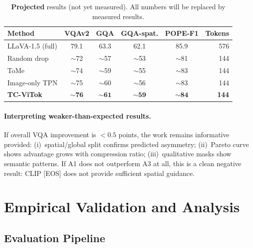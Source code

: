 \documentclass[11pt,a4paper]{article}
\begin{document}
\begin{table}[h]
\centering
\caption{\textbf{Projected} results (not yet measured). All numbers will
be replaced by measured results.}
\label{tab:projected}
\renewcommand{\arraystretch}{1.2}
\small
\begin{tabular}{@{}lccccr@{}}
  \toprule
  Method & VQAv2 & GQA & GQA-spat. & POPE-F1 & Tokens \\
  \midrule
  LLaVA-1.5 (full) & 79.1 & 63.3 & 62.1 & 85.9 & 576 \\
  Random drop & $\sim$72 & $\sim$57 & $\sim$53 & $\sim$81 & 144 \\
  ToMe & $\sim$74 & $\sim$59 & $\sim$55 & $\sim$83 & 144 \\
  Image-only TPN & $\sim$75 & $\sim$60 & $\sim$56 & $\sim$83 & 144 \\
  \textbf{TC-ViTok} & $\mathbf{\sim\!76}$ & $\mathbf{\sim\!61}$
    & $\mathbf{\sim\!59}$ & $\mathbf{\sim\!84}$ & \textbf{144} \\
  \bottomrule
\end{tabular}
\end{table}

\paragraph{Interpreting weaker-than-expected results.}
If overall VQA improvement is $< 0.5$ points, the work remains informative
provided: (i)~spatial/global split confirms predicted asymmetry;
(ii)~Pareto curve shows advantage grows with compression ratio;
(iii)~qualitative masks show semantic patterns. If A1 does not outperform
A3 at all, this is a clean negative result: CLIP [EOS] does not provide
sufficient spatial guidance.

\section{Empirical Validation and Analysis}
\label{sec:validation}

\subsection{Evaluation Pipeline}
\end{document}

